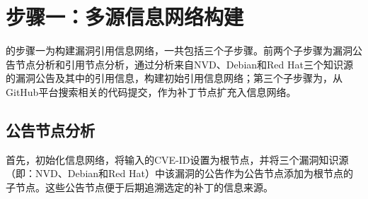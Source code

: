 
\section{步骤一：多源信息网络构建}
\tool 的步骤一为构建漏洞引用信息网络，一共包括三个子步骤。前两个子步骤为漏洞公告节点分析和引用节点分析，通过分析来自NVD、Debian和Red Hat三个知识源的漏洞公告及其中的引用信息，构建初始引用信息网络；第三个子步骤为，从GitHub平台搜索相关的代码提交，作为补丁节点扩充入信息网络。

\subsection{公告节点分析} \label{sec:advisory analysis}
首先，\tool 初始化信息网络，将输入的CVE-ID设置为根节点，并将三个漏洞知识源（即：NVD、Debian和Red Hat）中该漏洞的公告作为公告节点添加为根节点的子节点。这些公告节点便于后期追溯选定的补丁的信息来源。

